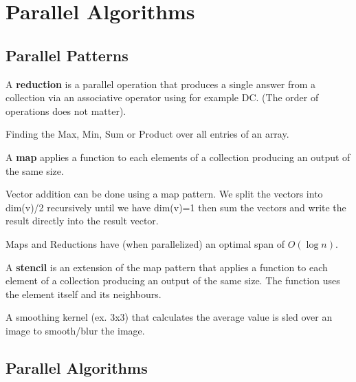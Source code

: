 \section{Parallel Algorithms}

\subsection{Parallel Patterns}

\begin{definition}
    A \textbf{reduction} is a parallel operation that produces a single answer from a collection via an
    associative operator using for example DC. (The order of operations does not matter).
\end{definition}

\begin{example}
    Finding the Max, Min, Sum or Product over all entries of an array.  
\end{example}

\begin{definition}
    A \textbf{map} applies a function to each elements of a collection producing an output of the same size.
\end{definition}

\begin{example}
    Vector addition can be done using a map pattern. We split the vectors into dim(v)/2 recursively
    until we have dim(v)=1 then sum the vectors and write the result directly into the result vector.
\end{example}

\begin{remark}
    Maps and Reductions have (when parallelized) an optimal span of $O(\log n)$.
\end{remark}

\begin{definition}
    A \textbf{stencil} is an extension of the map pattern that applies a function to each element of a collection producing an output of the same size. The function uses the element itself and its neighbours.
\end{definition}

\begin{example}
    A smoothing kernel (ex. 3x3) that calculates the average value is sled over an image to smooth/blur the image.
\end{example}

\subsection{Parallel Algorithms}

